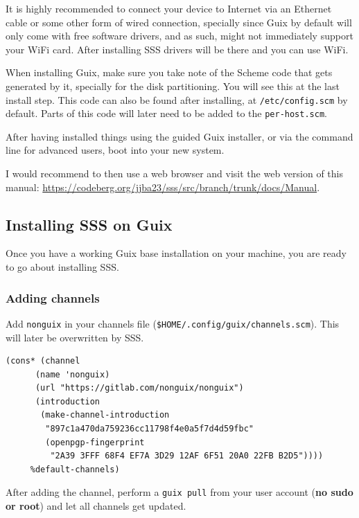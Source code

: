 \documentclass[11pt]{article}
\begin{document}
It is highly recommended to connect your device to Internet via an Ethernet cable or some other form of wired connection, specially since Guix by default will only come with free software drivers, and as such, might not immediately support your WiFi card. After installing SSS drivers will be there and you can use WiFi.

When installing Guix, make sure you take note of the Scheme code that gets generated by it, specially for the disk partitioning. You will see this at the last install step. This code can also be found after installing, at \texttt{/etc/config.scm} by default. Parts of this code will later need to be added to the \texttt{per-host.scm}.

After having installed things using the guided Guix installer, or via the command line for advanced users, boot into your new system.

I would recommend to then use a web browser and visit the web version of this manual: \url{https://codeberg.org/jjba23/sss/src/branch/trunk/docs/Manual}.

\subsection{Installing SSS on Guix}
\label{sec:orgeaf7cec}

Once you have a working Guix base installation on your machine, you are ready to go about installing SSS.

\subsubsection{Adding channels}
\label{sec:org5f536da}

Add \texttt{nonguix} in your channels file (\texttt{\$HOME/.config/guix/channels.scm}). This will later be overwritten by SSS.

\begin{verbatim}
(cons* (channel
      (name 'nonguix)
      (url "https://gitlab.com/nonguix/nonguix")
      (introduction
       (make-channel-introduction
        "897c1a470da759236cc11798f4e0a5f7d4d59fbc"
        (openpgp-fingerprint
         "2A39 3FFF 68F4 EF7A 3D29 12AF 6F51 20A0 22FB B2D5"))))
     %default-channels)

\end{verbatim}

After adding the channel, perform a \texttt{guix pull} from your user account (\textbf{no sudo or root}) and let all channels get updated.
\end{document}
